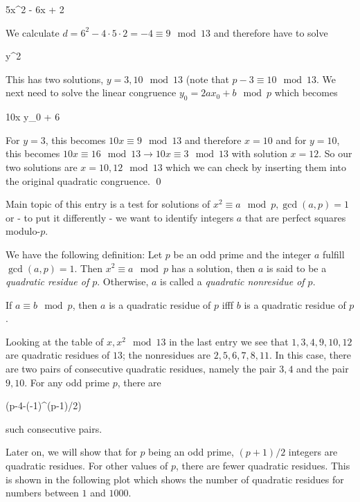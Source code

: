 \bee
5x^2 - 6x + 2  
\eee

We calculate $d = 6^2 - 4\cdot 5 \cdot 2 = -4 \equiv 9 \mod 13$ and therefore have to solve

\bee
y^2  
\eee

This has two solutions, $y = 3, 10 \mod 13$ (note that $p-3 \equiv 10 \mod 13$. We next need to solve the linear congruence $y_0 = 2ax_0 + b \mod p$ which becomes

\bee
10x \equiv y_0 + 6 
\eee

For $y = 3$, this becomes $10 x \equiv 9 \mod 13$ and therefore $x = 10$ and for $y = 10$, this becomes $10x \equiv 16 \mod 13 \rightarrow 10x \equiv 3 \mod 13$ with solution $x = 12$. So our two solutions are $x = 10, 12 \mod 13$ which we can check by inserting them into the original quadratic congruence. \qed

Main topic of this entry is a test for solutions of $x^2 \equiv a \mod p, \gcd(a,p)=1$ or - to put it differently - we want to identify integers $a$ that are perfect squares modulo-$p$.

We have the following definition: Let $p$ be an odd prime and the integer $a$ fulfill $\gcd(a,p) = 1$. Then $x^2 \equiv a \mod p$ has a solution, then $a$ is said to be a \emph{quadratic residue of $p$}. Otherwise, $a$ is called a \emph{quadratic nonresidue of $p$}.

If $a \equiv b \mod p$, then $a$ is a quadratic residue of $p$ ifff $b$ is a quadratic residue of $p$.

Looking at the table of $x, x^2 \mod 13$ in the last entry we see that $1, 3, 4, 9, 10, 12$ are quadratic residues of $13$; the nonresidues are $2,5,6,7,8,11$. In this case, there are two pairs of consecutive quadratic residues, namely the pair $3,4$ and the pair $9,10$. For any odd prime $p$, there are 

\bee
{}(p-4-(-1)^{(p-1)/2})
\eee

such consecutive pairs.

Later on, we will show that for $p$ being an odd prime, $(p+1)/2$ integers are quadratic residues. For other values of $p$, there are fewer quadratic residues. This is shown in the following plot which shows the number of quadratic residues for numbers between $1$ and $1000$.


